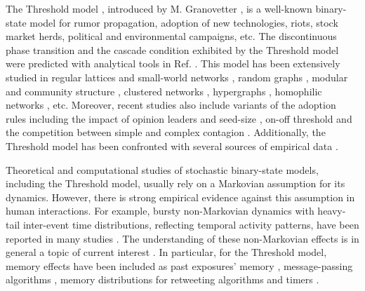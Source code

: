 The Threshold model \cite{watts-2002}, introduced by M. Granovetter \cite{granovetter-1978}, is a well-known binary-state model for rumor propagation, adoption of new technologies, riots, stock market herds, political and environmental campaigns, etc. %
The discontinuous phase transition and the cascade condition exhibited by the Threshold model were predicted with analytical tools in Ref. \cite{watts-2002}. This model has been extensively studied in regular lattices and small-world networks \cite{centola-2007}, random graphs \cite{gleeson-2007},  modular and community structure \cite{gleeson-2008}, clustered networks \cite{hackett-2011,hackett-2013}, hypergraphs \cite{de-arruda-2020}, homophilic networks \cite{diaz-diaz-2022}, etc. Moreover, recent studies also include variants of the adoption rules including
the impact of opinion leaders \cite{liu-2018} and seed-size \cite{singh-2013}, on-off threshold \cite{dodds-2013} and the competition between simple and complex contagion \cite{czaplicka-2016,min-2018,diaz-diaz-2022}. Additionally, the Threshold model has been confronted with several sources of empirical data \cite{centola-2010,karimi-2013,karsai-2014,rosenthal-2015,karsai-2016,mnsted-2017,unicomb-2018,guilbeault-2021}.


Theoretical and computational studies of stochastic binary-state models, including the Threshold model, usually rely on a Markovian assumption for its dynamics. 
However, there is strong empirical evidence against this assumption in human interactions.  For example, bursty non-Markovian dynamics with heavy-tail inter-event time distributions, reflecting temporal activity patterns,  have been reported in many studies \cite{iribarren-2009,karsai-2011,rybski-2012,zignani-2016,artime-2017,kumar-2020}. The understanding of these non-Markovian effects is in general a topic of current interest \cite{van-mieghem-2013,starnini-2017,peralta-2020C,peralta-2020A}. In particular, for the Threshold model, memory effects have been included as past exposures' memory \cite{dodds-2004}, message-passing algorithms \cite{shrestha-2014}, memory distributions for retweeting algorithms \cite{gleeson-2016} and timers \cite{oh-2018}.

